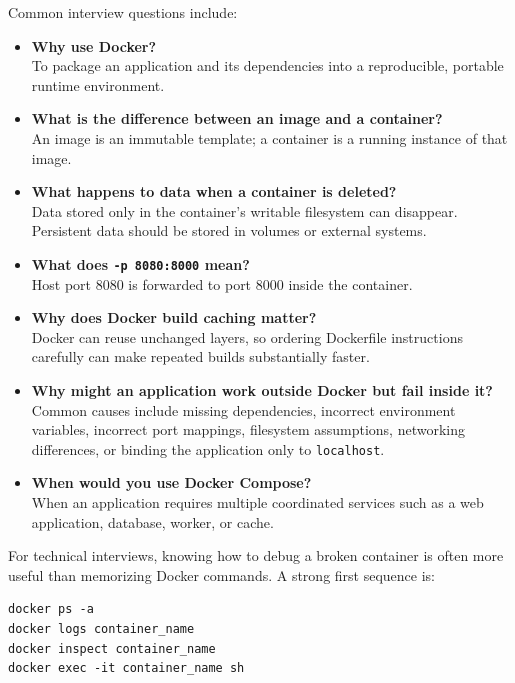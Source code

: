 \documentclass[11pt,letterpaper]{article}
\begin{document}
Common interview questions include:

\begin{itemize}[leftmargin=*]
    \item \textbf{Why use Docker?} \\
    To package an application and its dependencies into a reproducible,
    portable runtime environment.

    \item \textbf{What is the difference between an image and a container?} \\
    An image is an immutable template; a container is a running instance of
    that image.

    \item \textbf{What happens to data when a container is deleted?} \\
    Data stored only in the container's writable filesystem can disappear.
    Persistent data should be stored in volumes or external systems.

    \item \textbf{What does \texttt{-p 8080:8000} mean?} \\
    Host port 8080 is forwarded to port 8000 inside the container.

    \item \textbf{Why does Docker build caching matter?} \\
    Docker can reuse unchanged layers, so ordering Dockerfile instructions
    carefully can make repeated builds substantially faster.

    \item \textbf{Why might an application work outside Docker but fail inside it?} \\
    Common causes include missing dependencies, incorrect environment variables,
    incorrect port mappings, filesystem assumptions, networking differences,
    or binding the application only to \texttt{localhost}.

    \item \textbf{When would you use Docker Compose?} \\
    When an application requires multiple coordinated services such as a web
    application, database, worker, or cache.
\end{itemize}

For technical interviews, knowing how to debug a broken container is often more
useful than memorizing Docker commands. A strong first sequence is:

\begin{lstlisting}
docker ps -a
docker logs container_name
docker inspect container_name
docker exec -it container_name sh
\end{lstlisting}
\end{document}
